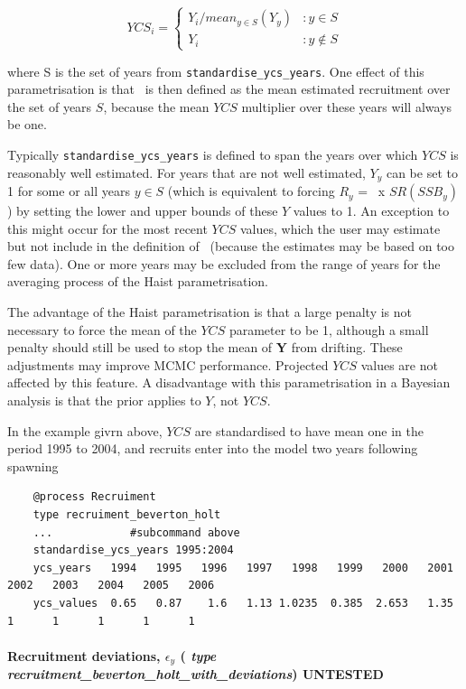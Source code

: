 \[
YCS_i =
\begin{cases}
Y_i / mean_{y \in S}(Y_y) & :y \in S\\
Y_i					 & :y \notin S
\end{cases}
\]

where S is the set of years from \texttt{standardise\_ycs\_years}. One effect of this parametrisation is that \Rzero\ is then defined as the mean estimated recruitment over the set of years $S$, because the mean $YCS$ multiplier over these years will always be one.

Typically \texttt{standardise\_ycs\_years} is defined to span the years over which $YCS$ is reasonably well estimated. For years that are not well estimated, $Y_y$ can be set to 1 for some or all years $y\in S$ (which is equivalent to forcing $R_y$ = \Rzero\ x $SR(SSB_y)$) by setting the lower and upper bounds of these $Y$ values to 1. An exception to this might occur for the most recent $YCS$ values, which the user may estimate but not include in the definition of \Rzero\ (because the estimates may be based on too few data). One or more years may be excluded from the range of years for the averaging process of the Haist parametrisation.

The advantage of the Haist parametrisation is that a large penalty is not necessary to force the mean of the $YCS$ parameter to be 1, although a small penalty should still be used to stop the mean of \textbf{Y} from drifting. These adjustments may improve MCMC performance. Projected $YCS$ values are not affected by this feature. A disadvantage with this parametrisation in a Bayesian analysis is that the prior applies to $Y$, not $YCS$.

In the  example givrn above,  $YCS$ are standardised to have mean one in the period 1995 to 2004, and recruits enter into the model two years following spawning

{\small{\begin{verbatim}
	@process Recruiment
	type recruiment_beverton_holt
	...            #subcommand above
	standardise_ycs_years 1995:2004
	ycs_years   1994   1995   1996   1997   1998   1999   2000   2001   2002   2003   2004   2005   2006
	ycs_values  0.65   0.87    1.6   1.13 1.0235  0.385  2.653   1.35      1      1      1      1      1
\end{verbatim}}}


\paragraph*{Recruitment deviations, $\epsilon_y$ ( \textit{type recruitment\_beverton\_holt\_with\_deviations}) UNTESTED}

